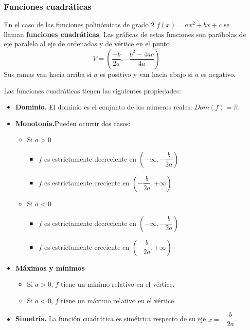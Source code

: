 \subsubsection{Funciones cuadráticas}
\begin{definition}
En el caso de las funciones polinómicas de grado 2 $f(x)=ax^2+bx+c$ se llaman \textbf{funciones cuadráticas}. Las gráficas de estas funciones son parábolas de eje paralelo al eje de ordenadas y de vértice en el punto 
$$V=(\dfrac{-b}{2a},-\dfrac{b^2-4ac}{4a})$$
Sus ramas van hacia arriba si $a$ es positivo y van hacia abajo si $a$ es negativo.
\end{definition}
Las funciones cuadráticas tienen las siguientes propiedades:
\begin{itemize}
	\item \textbf{Dominio.} El dominio es el conjunto de los números reales: $Dom(f)=\mathbb{R}$.
	\item \textbf{Monotonía.}Pueden ocurrir dos casos:
	\begin{itemize}
		\item Si $a>0$
		\begin{itemize}
			\item $f$ es estrictamente decreciente en $(-\infty, -\dfrac{b}{2a})$
			\item $f$ es estrictamente creciente en $(-\dfrac{b}{2a}, +\infty)$
		\end{itemize}
		\item Si $a<0$
		\begin{itemize}
			\item $f$ es estrictamente decreciente en $(-\infty, -\dfrac{b}{2a})$
			\item $f$ es estrictamente creciente en $(-\dfrac{b}{2a}, +\infty)$ 
		\end{itemize}
	\end{itemize}
	\item \textbf{Máximos y mínimos}
	\begin{itemize}
		\item Si $a>0$, $f$ tiene un mínimo relativo en el vértice.
		\item Si $a<0$, $f$ tiene un máximo relativo en el vértice.
	\end{itemize}
	\item \textbf{Simetría.} La función cuadrática es simétrica respecto de su eje $x=-\dfrac{b}{2a}$. 
\end{itemize}
